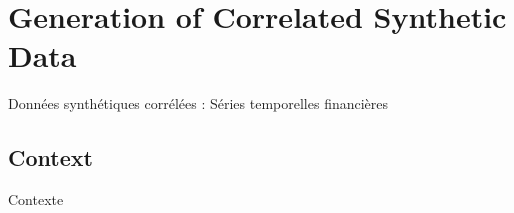 
\newpage

\section{Generation of Correlated Synthetic Data}{Données synthétiques corrélées : Séries temporelles financières} %

\label{app:sec:syntheticdata-finance} %



\subsection*{Context}{Contexte}

